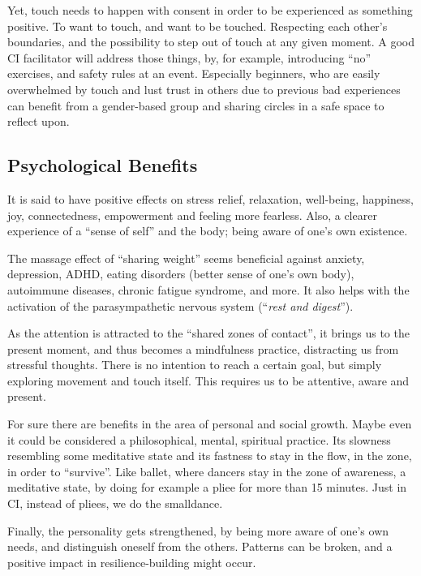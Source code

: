 Yet, touch needs to happen with consent in order to be experienced as something positive.
To want to touch, and want to be touched.
Respecting each other's boundaries, and the possibility to step out of touch at any given moment.
A good CI facilitator will address those things, by, for example, introducing ``no'' exercises, and safety rules at an event.
Especially beginners, who are easily overwhelmed by touch and lust trust in others due to previous bad experiences can benefit from a gender-based group and sharing circles in a safe space to reflect upon.

\subsection{Psychological Benefits}\label{subsec:psychological-health-benefits}

It is said to have positive effects on stress relief, relaxation, well-being, happiness, joy, connectedness, empowerment and feeling more fearless.
Also, a clearer experience of a ``sense of self'' and the body;
being aware of one's own existence.

The massage effect of ``sharing weight'' seems beneficial against anxiety, depression, ADHD, eating disorders (better sense of one's own body), autoimmune diseases, chronic fatigue syndrome, and more.
It also helps with the activation of the parasympathetic nervous system (``\textit{rest and digest}'').

As the attention is attracted to the ``shared zones of contact'', it brings us to the present moment, and thus becomes a mindfulness practice, distracting us from stressful thoughts.
There is no intention to reach a certain goal, but simply exploring movement and touch itself.
This requires us to be attentive, aware and present.

For sure there are benefits in the area of personal and social growth.
Maybe even it could be considered a philosophical, mental, spiritual practice.
Its slowness resembling some meditative state and its fastness to stay in the flow, in the zone, in order to ``survive''.
Like ballet, where dancers stay in the zone of awareness, a meditative state, by doing for example a pliee for more than 15 minutes.
Just in CI, instead of pliees, we do the \gls{smalldance}.

Finally, the personality gets strengthened, by being more aware of one's own needs, and distinguish oneself from the others.
Patterns can be broken, and a positive impact in resilience-building might occur.

